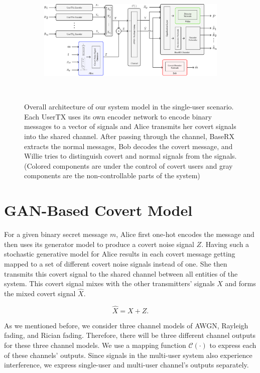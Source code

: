 \begin{figure}[thp]
	\center
	\begin{subfigure}{0.7\textwidth}
		\includegraphics[width=\linewidth]{figs/multi_system_architecture}
	\end{subfigure}
	\\
	\caption{Overall architecture of our system model in the single-user scenario. Each UserTX uses its own encoder network to encode binary messages to a vector of signals and Alice transmits her covert signals into the shared channel. After passing through the channel, BaseRX extracts the normal messages, Bob decodes the covert message, and Willie tries to distinguish covert and normal signals from the signals. (Colored components are under the control of covert users and gray components are the non-controllable parts of the system)}
	\label{fig:multi_system_architecture}
\end{figure}

\section{GAN-Based Covert Model}
For a given binary secret message \(m\), Alice first one-hot encodes the message and then uses its generator model to produce a covert noise signal \(Z\). Having such a stochastic generative model for Alice results in each covert message getting mapped to a set of different covert noise signals instead of one. She then transmits this covert signal to the shared channel between all entities of the system. This covert signal mixes with the other transmitters' signals \(X\) and forms the mixed covert signal \(\hat{X}\). 

\begin{equation}
	\hat{X} = X + Z.
\end{equation}

As we mentioned before, we consider three channel models of AWGN, Rayleigh fading, and Rician fading. Therefore, there will be three different channel outputs for these three channel models. We use a mapping function \(\mathcal{C}(\cdot)\) to express each of these channels' outputs. Since signals in the multi-user system also experience interference, we express single-user and multi-user channel's outputs separately.

